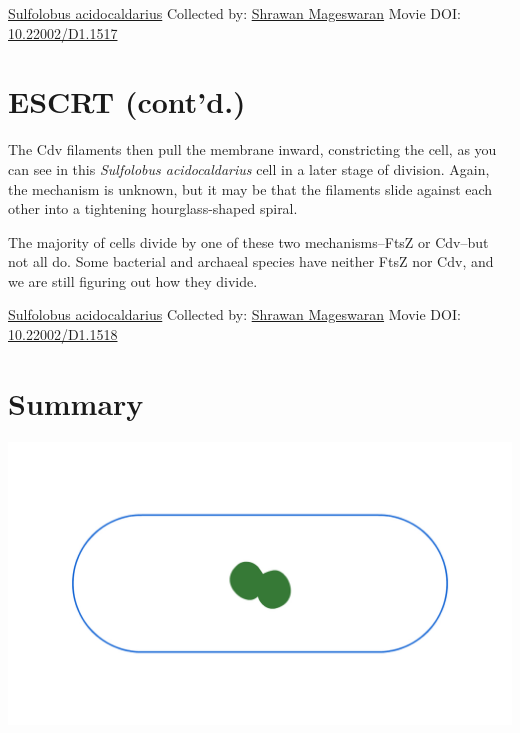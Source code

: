 \documentclass[]{tufte-book}
\begin{document}
\hypertarget{htmlwidget-d0d7ada19ba74a044f02}{}

\label{fig:5-11}\protect\hyperlink{tree}{Sulfolobus acidocaldarius} Collected by: \protect\hyperlink{shrawan_mageswaran}{Shrawan Mageswaran} Movie DOI: \href{https://doi.org/10.22002/D1.1517}{10.22002/D1.1517}

\hypertarget{escrt-contd.}{%
\section{ESCRT (cont'd.)}\label{escrt-contd.}}

The Cdv filaments then pull the membrane inward, constricting the cell, as you can see in this \emph{Sulfolobus acidocaldarius} cell in a later stage of division. Again, the mechanism is unknown, but it may be that the filaments slide against each other into a tightening hourglass-shaped spiral.

The majority of cells divide by one of these two mechanisms--FtsZ or Cdv--but not all do. Some bacterial and archaeal species have neither FtsZ nor Cdv, and we are still figuring out how they divide.



\hypertarget{htmlwidget-a1d852377f80eb0af92f}{}

\label{fig:5-12}\protect\hyperlink{tree}{Sulfolobus acidocaldarius} Collected by: \protect\hyperlink{shrawan_mageswaran}{Shrawan Mageswaran} Movie DOI: \href{https://doi.org/10.22002/D1.1518}{10.22002/D1.1518}

\hypertarget{summary-3}{%
\section{Summary}\label{summary-3}}

\includegraphics{img/summaries/05_Division}
\end{document}
